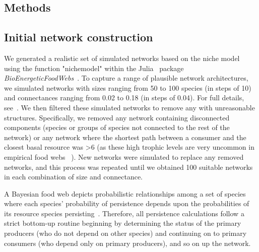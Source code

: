\documentclass[12pt]{article}
\begin{document}
\begin{spacing}{2.0}

    	
\section*{Methods}

	\subsection*{Initial network construction}

		We generated a realistic set of simulated networks based on the niche model~\citep{Williams2000,Stouffer2007} using the function "nichemodel" within the Julia~\citep{Julia} package \emph{BioEnergeticFoodWebs}~\citep{bioenergfw}. 
		To capture a range of plausible network architectures, we simulated networks with sizes ranging from 50 to 100 species (in steps of 10) and connectances ranging from 0.02 to 0.18 (in steps of 0.04). 
		For full details, see~\citet{Cirtwill2021_inprep}.
        We then filtered these simulated networks to remove any with unreasonable structures.
		Specifically, we removed any network containing disconnected components (species or groups of species not connected to the rest of the network) or any network where the shortest path between a consumer and the closest basal resource was \textgreater6 (as these high trophic levels are very uncommon in empirical food webs ~\citep{}).
		New networks were simulated to replace any removed networks, and this process was repeated until we obtained 100 suitable networks in each combination of size and connectance.
              
		A Bayesian food web depicts probabilistic relationships among a set of species where each species' probability of persistence depends upon the probabilities of its resource species persisting~\citep{Jensen_Nielsen,Eklof2013}. 
		Therefore, all persistence calculations follow a strict bottom-up routine beginning by determining the status of the primary producers (who do not depend on other species) and continuing on to primary consumers (who depend only on primary producers), and so on up the network.
		

\end{spacing}
\end{document}
